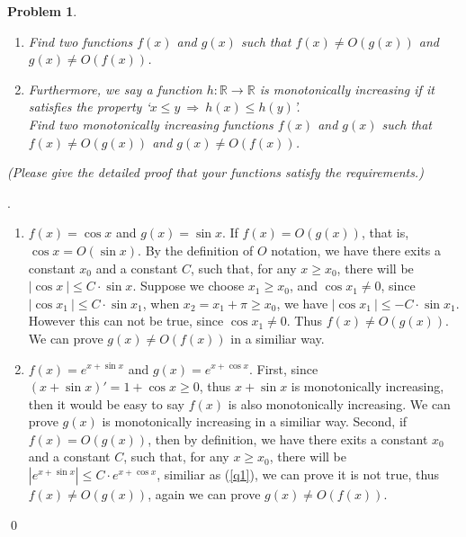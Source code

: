 \documentclass[12pt]{article}
\newtheorem{hw}{Problem}
\newenvironment{sol}
  {\par\vspace{3mm}\noindent{\it Solution}.}
  {\qed}
\begin{document}
\begin{hw}
\begin{enumerate}
\item Find two functions $f(x)$ and $g(x)$ such that $f(x)\neq O(g(x))$ and $g(x)\neq O(f(x))$.
\item Furthermore, we say a function $h:\mathbb{R}\rightarrow \mathbb{R}$ is \emph{monotonically increasing} if it satisfies the property `$x\leq y ~\Rightarrow~ h(x)\leq h(y)$'.
 \\
 Find two monotonically increasing functions $f(x)$ and $g(x)$ such that $f(x)\neq O(g(x))$ and $g(x)\neq O(f(x))$.
 \end{enumerate}
 \vspace{2mm}
    (Please give the detailed proof that your functions satisfy the requirements.)
\end{hw}
\begin{sol}
	\begin{enumerate}
		\item \label{q1} $f(x) = \cos x$ and $g(x) = \sin x$. If $f(x) = O(g(x))$, that is, $\cos x = O(\sin x)$. By the definition of $O$ notation, we have there exits a constant $x_0$ and a constant $C$, such that, for any $x \geq x_0$, there will be $|\cos x\ | \leq C \cdot \sin x$. Suppose we choose $x_1 \geq x_0$, and $\cos x_1 \neq 0$, since $|\cos x_1\ | \leq C \cdot \sin x_1$, when $x_2 = x_1 + \pi \geq x_0$, we have $|\cos x_1\ | \leq -C \cdot \sin x_1$. However this can not be true, since $\cos x_1 \neq 0$. Thus $f(x) \neq O(g(x))$. We can prove $g(x) \neq O(f(x))$ in a similiar way.
		
		\item $f(x) = e^{x+\sin x}$ and $g(x) = e^{x + \cos x}$. First, since $(x + \sin x)' = 1 + \cos x \geq 0$, thus $x + \sin x$ is monotonically increasing, then it would be easy to say $f(x)$ is also monotonically increasing. We can prove $g(x)$ is monotonically increasing in a similiar way. Second, if $f(x) = O(g(x))$, then by definition, we have there exits a constant $x_0$ and a constant $C$, such that, for any $x \geq x_0$, there will be $|e^{x+\sin x}| \leq C \cdot e^{x + \cos x}$, similiar as (\ref{q1}), we can prove it is not true, thus $f(x) \neq O(g(x))$, again we can prove $g(x) \neq O(f(x))$.
	\end{enumerate}
\end{sol}
\end{document}
